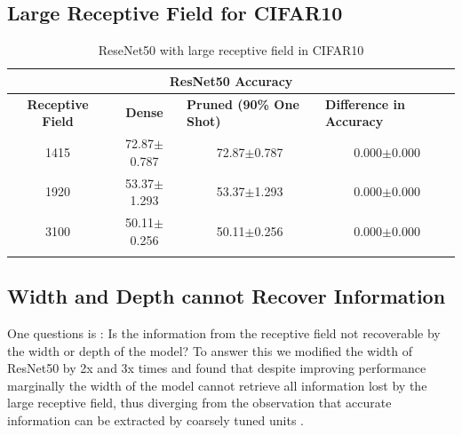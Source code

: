\subsection{Large Receptive Field for CIFAR10}
\label{subsec:LargeRFCF10}

\begin{table}[H]
  \centering
\begin{tabular}{@{}cccc@{}}
\toprule
\multicolumn{4}{c}{\textbf{ResNet50 Accuracy}}                                                                                         \\ \midrule
\textbf{Receptive Field} & \textbf{Dense}  & \multicolumn{1}{l}{\textbf{Pruned (90\% One Shot)}} & \multicolumn{1}{l}{\textbf{Difference in Accuracy}} \\ \midrule
1415                     & 72.87$\pm$0.787 & 72.87$\pm$0.787                     & 0.000$\pm$0.000                                     \\
1920                     & 53.37$\pm$1.293 & 53.37$\pm$1.293                     & 0.000$\pm$0.000                                     \\
3100                     & 50.11$\pm$0.256 & 50.11$\pm$0.256                     & 0.000$\pm$0.000
\\ \bottomrule \\
\end{tabular}
\caption{ReseNet50 with large receptive field in CIFAR10}
\label{tab:cifar10  largeRF one shot pruning rate 09}
\end{table}



\subsection{Width and Depth cannot Recover Information}

One questions is : Is the information from the receptive field not recoverable by the width or depth of the model? To
answer this we modified the width of ResNet50  by 2x and 3x times and found that despite improving performance marginally the width
of the model cannot retrieve all information lost by the large receptive field, thus diverging from the observation that
accurate information can be extracted by coarsely tuned units \citep{ballardParallelVisualComputation1983}.


